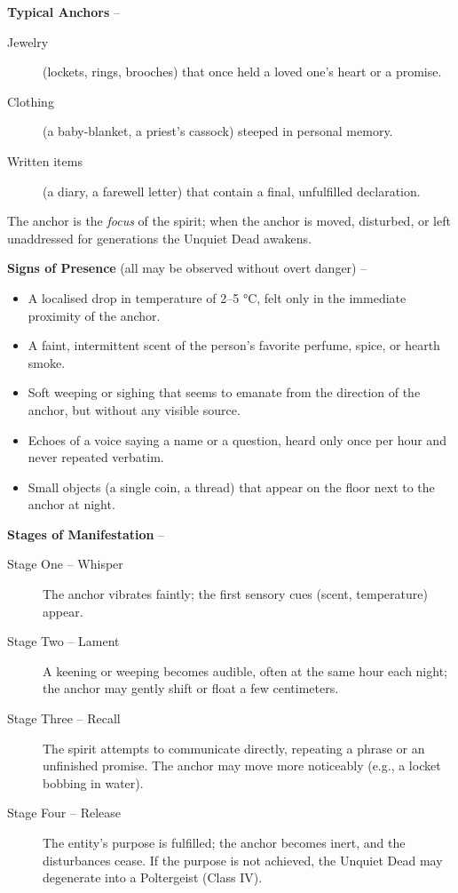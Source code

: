 \textbf{Typical Anchors} --  
\begin{description}
  \item[Jewelry] (lockets, rings, brooches) that once held a loved one's heart or a promise.
  \item[Clothing] (a baby-blanket, a priest's cassock) steeped in personal memory.
  \item[Written items] (a diary, a farewell letter) that contain a final, unfulfilled declaration.
\end{description}
The anchor is the \textit{focus} of the spirit; when the anchor is moved, disturbed, or left unaddressed for generations the Unquiet Dead awakens.

\textbf{Signs of Presence} (all may be observed without overt danger) --  
\begin{itemize}
  \item A localised drop in temperature of 2--5 °C, felt only in the immediate proximity of the anchor.
  \item A faint, intermittent scent of the person's favorite perfume, spice, or hearth smoke.
  \item Soft weeping or sighing that seems to emanate from the direction of the anchor, but without any visible source.
  \item Echoes of a voice saying a name or a question, heard only once per hour and never repeated verbatim.
  \item Small objects (a single coin, a thread) that appear on the floor next to the anchor at night.
\end{itemize}

\textbf{Stages of Manifestation} --  
\begin{description}
  \item[Stage One -- Whisper] The anchor vibrates faintly; the first sensory cues (scent, temperature) appear.
  \item[Stage Two -- Lament] A keening or weeping becomes audible, often at the same hour each night; the anchor may gently shift or float a few centimeters.
  \item[Stage Three -- Recall] The spirit attempts to communicate directly, repeating a phrase or an unfinished promise. The anchor may move more noticeably (e.g., a locket bobbing in water).
  \item[Stage Four -- Release] The entity's purpose is fulfilled; the anchor becomes inert, and the disturbances cease. If the purpose is not achieved, the Unquiet Dead may degenerate into a Poltergeist (Class IV).
\end{description}

